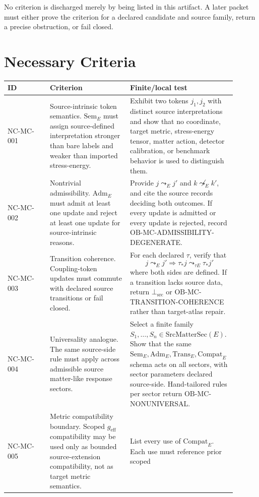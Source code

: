\documentclass[11pt]{article}
\newcommand{\geff}{g_{\mathrm{eff}}}
\newcommand{\BottomSrc}{\bot_{\mathrm{src}}}
\newcommand{\SrcMatterSec}{\mathrm{SrcMatterSec}}
\newcommand{\Sem}{\mathrm{Sem}}
\newcommand{\Adm}{\mathrm{Adm}}
\newcommand{\Trans}{\mathrm{Trans}}
\newcommand{\Compat}{\mathrm{Compat}}
\newcommand{\OBMC}{\mathrm{OB}\mbox{-}\mathrm{MC}}
\begin{document}
No criterion is discharged merely by being listed in this artifact. A later
packet must either prove the criterion for a declared candidate and source
family, return a precise obstruction, or fail closed.

\section{Necessary Criteria}

\begin{longtable}{p{0.18\linewidth}p{0.34\linewidth}p{0.38\linewidth}}
\toprule
ID & Criterion & Finite/local test \\
\midrule
NC-MC-001 &
Source-intrinsic token semantics. \(\Sem_E\) must assign source-defined
interpretation stronger than bare labels and weaker than imported
stress-energy. &
Exhibit two tokens \(j_1,j_2\) with distinct source interpretations and show
that no coordinate, target metric, stress-energy tensor, matter action,
detector calibration, or benchmark behavior is used to distinguish them. \\
\addlinespace
NC-MC-002 &
Nontrivial admissibility. \(\Adm_E\) must admit at least one update and reject
at least one update for source-intrinsic reasons. &
Provide \(j\leadsto_E j'\) and \(k\not\leadsto_E k'\), and cite the source
records deciding both outcomes. If every update is admitted or every update is
rejected, record \(\OBMC\)-ADMISSIBILITY-DEGENERATE. \\
\addlinespace
NC-MC-003 &
Transition coherence. Coupling-token updates must commute with declared source
transitions or fail closed. &
For each declared \(\tau\), verify that
\[
  j\leadsto_E j' \Rightarrow
  \tau_\ast j\leadsto_{\tau E}\tau_\ast j'
\]
where both sides are defined. If a transition lacks source data, return
\(\BottomSrc\) or \(\OBMC\)-TRANSITION-COHERENCE rather than target-atlas
repair. \\
\addlinespace
NC-MC-004 &
Universality analogue. The same source-side rule must apply across admissible
source matter-like response sectors. &
Select a finite family \(S_1,\ldots,S_n\in\SrcMatterSec(E)\). Show that the
same \(\Sem_E,\Adm_E,\Trans_E,\Compat_E\) schema acts on all sectors, with
sector parameters declared source-side. Hand-tailored rules per sector return
\(\OBMC\)-NONUNIVERSAL. \\
\addlinespace
NC-MC-005 &
Metric compatibility boundary. Scoped \(\geff\) compatibility may be used only
as bounded source-extension compatibility, not as target metric semantics. &
List every use of \(\Compat_E\). Each use must reference prior scoped

\end{longtable}
\end{document}
